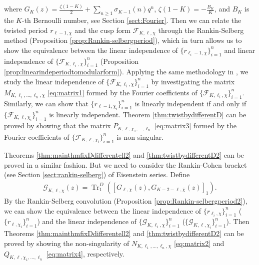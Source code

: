 \documentclass[11pt,letterpaper,reqno]{amsart}
\numberwithin{figure}{section}
\numberwithin{table}{section}
\theoremstyle{definition}
\theoremstyle{plain}
\theoremstyle{definition}
\theoremstyle{definition}
\theoremstyle{remark}
\numberwithin{equation}{section}
\theoremstyle{remark}
\DeclareMathOperator{\Tr}{Tr}
\begin{document}
where  $G_K(z)=\frac{\zeta(1-K)}{2}+\sum_{n\geq1}\sigma_{K-1}(n)q^n$, $\zeta(1-K)=-\frac{B_K}{K}$, and $B_K$ is the $K$-th Bernoulli number, see Section \ref{sect:Fourier}. Then we can relate the twisted period $r_{\ell-1,\chi}$ and the cusp form $\mathcal{F}_{K,\ell,\chi}$ through the Rankin-Selberg method (Proposition \ref{prop:Rankin-selbergperiod}), which in turn allows us to show the equivalence between the linear independence of $\{r_{\ell_i-1,\chi}\}_{i=1}^n$ and linear independence of $\{\mathcal{F}_{K,\ell_i,\chi}\}_{i=1}^n$ (Proposition \ref{prop:linearindeperiodtomodularform}). Applying the same methodology in \cite{oddperiods,evenperiods}, we study the linear independence of $\{\mathcal{F}_{K,\ell_i,\chi}\}_{i=1}^n$ by investigating the matrix $M_{K,\ell_1,...,\ell_n,\chi}$ \eqref{eq:matrix1} formed by the Fourier coefficients of $\{\mathcal{F}_{K,\ell_i,\chi}\}_{i=1}^n$. Similarly, we can show that $\{r_{\ell-1,\chi_i}\}_{i=1}^n$ is linearly independent if and only if $\{\mathcal{F}_{K,\ell,\chi_i}\}_{i=1}^n$  is linearly independent. Theorem \ref{thm:twistbydifferentD} can be proved by showing that the matrix  $P_{K,\ell, \chi_1,...,\ell_n}$ \eqref{eq:matrix3} formed by the Fourier coefficients of $\{\mathcal{F}_{K,\ell,\chi_i}\}_{i=1}^n$ is non-singular.

Theorems \ref{thm:mainthmfixDdifferentell2} and \ref{thm:twistbydifferentD2} can be proved in a similar fashion. But we need to consider the Rankin-Cohen bracket (see Section \ref{sect:rankin-selberg}) of Eisenstein series. Define 
\begin{align}\mathcal{G}_{K,\ell,\chi}(z)=\Tr^D_1([G_{\ell,\chi}(z),G_{K-2-\ell,\overline{\chi}}(z)]_1).\label{eq:G-def}
\end{align}
By the Rankin-Selberg convolution (Proposition \ref{prop:Rankin-selbergperiod2}), we can show the equivalence between the linear independence of $\{r_{\ell_i,\chi}\}_{i=1}^n$ ($\{r_{\ell,\chi_i}\}_{i=1}^n$) and the linear independence of $\{\mathcal{G}_{K,\ell_i,\chi}\}_{i=1}^n$ ($\{\mathcal{G}_{K,\ell,\chi_i}\}_{i=1}^n$). Then Theorems \ref{thm:mainthmfixDdifferentell2} and \ref{thm:twistbydifferentD2} can be proved by showing the non-singularity of  $N_{K,\ell_1,...,\ell_n,\chi}$ \eqref{eq:matrix2} and $Q_{K,\ell, \chi_1,...,\ell_n}$ \eqref{eq:matrix4}, respectively.
\end{document}
